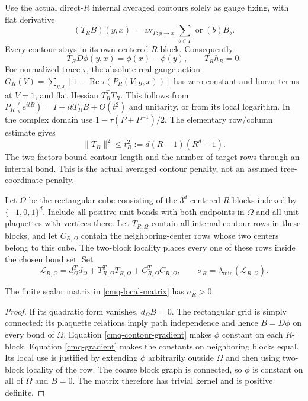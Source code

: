Use the actual direct-$R$ internal averaged contours solely as
gauge fixing, with flat derivative
\begin{equation}
 (T_RB)(y,x)=\operatorname{av}_{\Gamma:y\to x}
              \sum_{b\in\Gamma}\operatorname{or}(b)B_b.
 \label{cmq-contour}
\end{equation}
Every contour stays in its own centered $R$-block. Consequently
\begin{equation}
 T_RD\phi(y,x)=\phi(x)-\phi(y),\qquad T_Rh_R=0.
 \label{cmq-contour-gradient}
\end{equation}
For normalized trace $\tau$, the absolute real gauge action
$G_R(V)=\sum_{y,x}[1-\operatorname{Re}\tau(P_R(V;y,x))]$
has zero constant and linear terms at $V=1$, and flat Hessian
$T_R^TT_R$. This follows from
$P_R(e^{itB})=I+itT_RB+O(t^2)$ and unitarity, or from its
local logarithm. In the complex domain use
$1-\tau(P+P^{-1})/2$. The elementary row/column estimate gives
\begin{equation}
 \|T_R\|^2\leq t_R^2:=d(R-1)(R^d-1).
 \label{cmq-contour-upper}
\end{equation}
The two factors bound contour length and the number of target
rows through an internal bond. This is the actual averaged
contour penalty, not an assumed tree-coordinate penalty.

Let $\Omega$ be the rectangular cube consisting of the $3^d$
centered $R$-blocks indexed by $\{-1,0,1\}^d$. Include all
positive unit bonds with both endpoints in $\Omega$ and all
unit plaquettes with vertices there. Let $T_{R,\Omega}$ contain
all internal contour rows in these blocks, and let
$C_{R,\Omega}$ contain the neighboring-center rows whose two
centers belong to this cube. The two-block locality places every
one of these rows inside the chosen bond set. Set
\begin{equation}
 \mathcal L_{R,\Omega}
 =d_\Omega^Td_\Omega+T_{R,\Omega}^TT_{R,\Omega}
                         +C_{R,\Omega}^TC_{R,\Omega},
 \qquad \sigma_R=\lambda_{\min}(\mathcal L_{R,\Omega}).
 \label{cmq-local-matrix}
\end{equation}

\begin{lemma}
\label{cmq-local-positivity}
The finite scalar matrix in \eqref{cmq-local-matrix} has
$\sigma_R>0$.
\end{lemma}
\begin{proof}
If its quadratic form vanishes, $d_\Omega B=0$. The rectangular
grid is simply connected: its plaquette relations imply path
independence and hence $B=D\phi$ on every bond of $\Omega$.
Equation \eqref{cmq-contour-gradient} makes $\phi$ constant on
each $R$-block. Equation \eqref{cmq-gradient} makes the constants
on neighboring blocks equal. Its local use is justified by
extending $\phi$ arbitrarily outside $\Omega$ and then using
two-block locality of the row. The coarse block graph is
connected, so $\phi$ is constant on all of $\Omega$ and $B=0$.
The matrix therefore has trivial kernel and is positive definite.
\end{proof}

